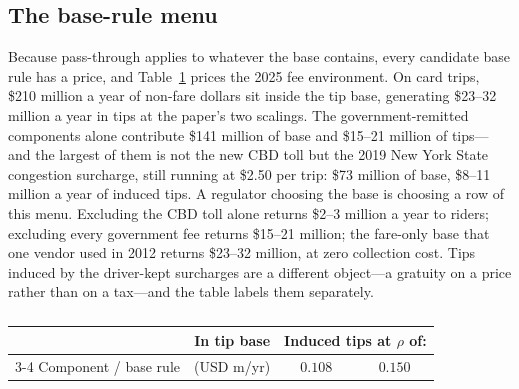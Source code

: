 \subsection{The base-rule menu}
Because pass-through applies to whatever the base contains, every
candidate base rule has a price, and Table~\ref{tab:menu} prices the
2025 fee environment. On card trips, \$210 million a year of non-fare
dollars sit inside the tip base, generating \$23--32 million a year in
tips at the paper's two scalings. The government-remitted components
alone contribute \$141 million of base and \$15--21 million of tips---
and the largest of them is not the new CBD toll but the 2019 New York
State congestion surcharge, still running at \$2.50 per trip: \$73
million of base, \$8--11 million a year of induced tips. A regulator
choosing the base is choosing a row of this menu. Excluding the CBD
toll alone returns \$2--3 million a year to riders; excluding every
government fee returns \$15--21 million; the fare-only base that one
vendor used in 2012 returns \$23--32 million, at zero collection cost.
Tips induced by the driver-kept surcharges are a different object---a
gratuity on a price rather than on a tax---and the table labels them
separately.

\begin{table}[!htbp]
  \centering
  \singlespacing
  \caption{}
  \label{tab:menu}
  \small
  \begin{tabular}{@{}p{}rcc@{}}
    \toprule
    & In tip base & \multicolumn{2}{c}{Induced tips at $\rho$ of:} \\
    \cmidrule(lr){3-4}
    Component / base rule & (USD m/yr) & $0.108$ & $0.150$ \\
    \midrule
    
    \bottomrule
  \end{tabular}
\end{table}

